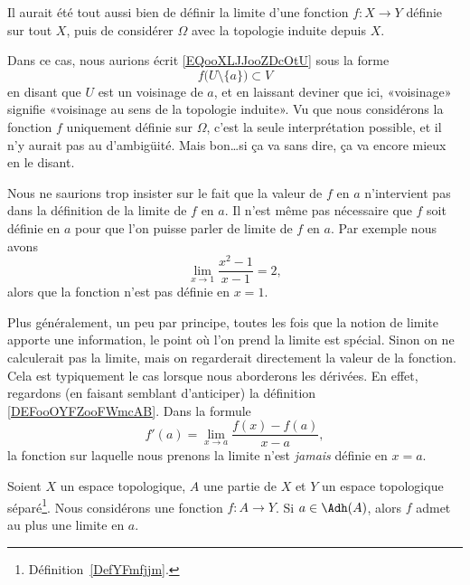 \begin{normaltext}
	Il aurait été tout aussi bien de définir la limite d'une fonction \( f\colon X\to Y\) définie sur tout \( X\), puis de considérer \( \Omega\) avec la topologie induite depuis \( X\).

	Dans ce cas, nous aurions écrit \eqref{EQooXLJJooZDcOtU} sous la forme
	\begin{equation}
		f\Big(  U\setminus\{ a \} \Big)\subset V
	\end{equation}
	en disant que \( U\) est un voisinage de \( a\), et en laissant  deviner que ici, «voisinage» signifie «voisinage au sens de la topologie induite». Vu que nous considérons la fonction \( f\) uniquement définie sur \( \Omega\), c'est la seule interprétation possible, et il n'y aurait pas au d'ambigüité\cite{BIBooMDAKooGEtFUd}. Mais bon\ldots si ça va sans dire, ça va encore mieux en le disant.
\end{normaltext}

\begin{remark}
	Nous ne saurions trop insister sur le fait que la valeur de \( f\) en \( a\) n'intervient pas dans la définition de la limite de \( f\) en \( a\). Il n'est même pas nécessaire que \( f\) soit définie en \( a\) pour que l'on puisse parler de limite de \( f\) en \( a\). Par exemple nous avons
	\begin{equation}
		\lim_{x\to 1} \frac{ x^2-1 }{ x-1 }=2,
	\end{equation}
	alors que la fonction n'est pas définie en \( x=1\).

	Plus généralement, un peu par principe, toutes les fois que la notion de limite apporte une information, le point où l'on prend la limite est spécial. Sinon on ne calculerait pas la limite, mais on regarderait directement la valeur de la fonction. Cela est typiquement le cas lorsque nous aborderons les dérivées. En effet, regardons (en faisant semblant d'anticiper) la définition  \eqref{DEFooOYFZooFWmcAB}. Dans la formule
	\begin{equation}
		f'(a)=\lim_{x\to a} \frac{ f(x)-f(a) }{ x-a },
	\end{equation}
	la fonction sur laquelle nous prenons la limite n'est \emph{jamais} définie en \( x=a\).
\end{remark}

\begin{proposition}\label{PropFObayrf}
	Soient \( X\) un espace topologique, \( A\) une partie de \( X\) et \( Y\) un espace topologique séparé\footnote{Définition~\ref{DefYFmfjjm}.}. Nous considérons une fonction \( f\colon A\to Y\). Si \( a\in \Adh(A)\), alors \( f\) admet au plus une limite en \( a\).
\end{proposition}

